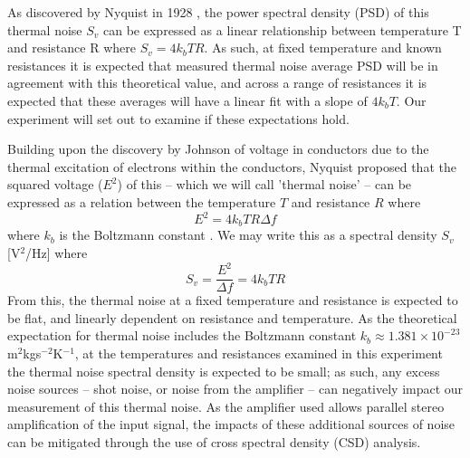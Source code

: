 \documentclass[aps,prl,twocolumn,superscriptaddress]{revtex4-1}
\begin{document}
As discovered by Nyquist in 1928 \cite{Nyquist1928}, the power spectral density (PSD) of this thermal noise $S_v$ can be expressed as a linear relationship between temperature T and resistance R where $S_v = 4k_bTR$. As such, at fixed temperature and known resistances it is expected that measured thermal noise average PSD will be in agreement with this theoretical value, and across a range of resistances it is expected that these averages will have a linear fit with a slope of $4k_bT$. Our experiment will set out to examine if these expectations hold.


Building upon the discovery by Johnson of voltage in conductors due to the thermal excitation of electrons within the conductors, Nyquist proposed that the squared voltage ($E^2$) of this -- which we will call 'thermal noise' -- can be expressed as a relation between the temperature $T$ and resistance $R$ where 
\begin{equation}
	E^2 = 4k_bTR\Delta f 
\end{equation} 
where $k_b$ is the Boltzmann constant \cite{Nyquist1928}. We may write this as a spectral density $S_v$ [V$^2$/Hz] where
\begin{equation}
	S_v = \frac{E^2}{\Delta f} = 4k_bTR
\end{equation}
From this, the thermal noise at a fixed temperature and resistance is expected to be flat, and linearly dependent on resistance and temperature. As the theoretical expectation for thermal noise includes the Boltzmann constant $k_b\approx 1.381\times10^{-23}$m$^2$kgs$^{-2}$K$^{-1}$, at the temperatures and resistances examined in this experiment the thermal noise spectral density is expected to be small; as such, any excess noise sources -- shot noise, or noise from the amplifier -- can negatively impact our measurement of this thermal noise. As the amplifier used allows parallel stereo amplification of the input signal, the impacts of these additional sources of noise can be mitigated through the use of cross spectral density (CSD) analysis.
\end{document}
